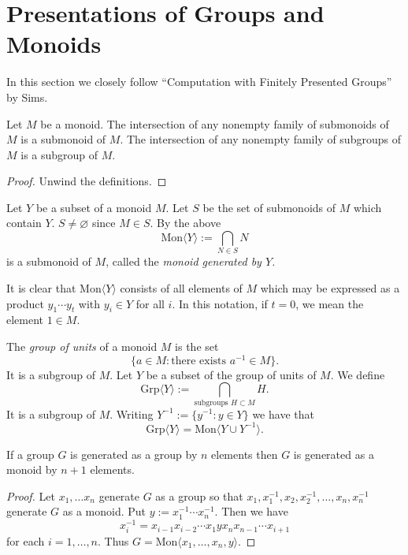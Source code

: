 
\section{Presentations of Groups and Monoids}

In this section we closely follow ``Computation with Finitely Presented Groups'' by Sims.

\begin{prop} Let $M$ be a monoid. The intersection of any nonempty family of
    submonoids of $M$ is a submonoid of $M$. The intersection of any nonempty
    family of subgroups of $M$ is a subgroup of $M$.
\end{prop}
\begin{proof} Unwind the definitions.
\end{proof}

\newcommand{\Mon}[1]{\ensuremath{\mathrm{Mon}\langle #1\rangle}}
\newcommand{\Grp}[1]{\ensuremath{\mathrm{Grp}\langle #1\rangle}}
\newcommand{\HH}{\ensuremath{\mathbb{H}}}

\begin{defn} Let $Y$ be a subset of a monoid $M.$ Let $S$ be the set of
    submonoids of $M$ which contain $Y$. $S\neq\varnothing$ since $M\in S$. By
    the above \[\Mon{Y} := \bigcap_{N \in S} N \] is a submonoid of $M$, called
    the \emph{monoid generated by $Y$.}
\end{defn}

\begin{ap} It is clear that $\Mon{Y}$ consists of all elements of $M$ which may
    be expressed as a product $y_1\cdots y_t$ with $y_i\in Y$ for all $i$. In
    this notation, if $t=0$, we mean the element $1\in M$.
\end{ap}

\begin{defns} The \emph{group of units} of a monoid $M$ is the set \[\{a \in M
    : \text{there exists } a^{-1} \in M\}.\] It is a subgroup of $M$. Let $Y$
    be a subset of the group of units of $M$. We define $$\Grp{Y} :=
    \bigcap_{\text{subgroups } H \subset M} H.$$ It is a subgroup of $M$.
    Writing $Y^{-1} := \{y^{-1} : y \in Y\}$ we have that \[\Grp{Y} =
    \Mon{Y\cup Y^{-1}}.\]
\end{defns}

\begin{prop} If a group $G$ is generated as a group by $n$ elements then $G$ is
    generated as a monoid by $n+1$ elements.
\end{prop}
\begin{proof} Let $x_1,\dots x_n$ generate $G$ as a group so that $x_1,
    x_1^{-1}, x_2, x_2^{-1}, \dots, x_n, x_n^{-1}$ generate $G$ as a monoid.
    Put $y := x_1^{-1} \cdots x_n^{-1}$. Then we have \[x_i^{-1} =
    x_{i-1}x_{i-2}\cdots x_1 y x_n x_{n-1} \cdots x_{i+1}\] for each $i =
    1,\dots ,n$. Thus $G = \Mon{x_1,\dots,x_n,y}$.
\end{proof}

